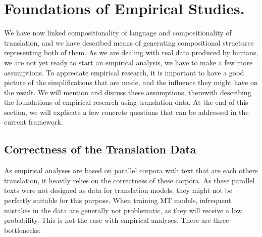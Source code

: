 \documentclass{report}
\theoremstyle{break}
\begin{document}
\section{Foundations of Empirical Studies.}

We have now linked compositionality of language and compositionality of translation, and we have described means of generating compositional structures representing both of them. As we are dealing with real data produced by humans, we are not yet ready to start an empirical analysis, we have to make a few more assumptions. To appreciate empirical research, it is important to have a good picture of the simplifications that are made, and the influence they might have on the result. We will mention and discuss these assumptions, therewith describing the foundations of empirical research using translation data. At the end of this section, we will explicate a few concrete questions that can be addressed in the current framework.
%


\subsection{Correctness of the Translation Data}

As empirical analyses are based on parallel corpora with text that are each others translation, it heavily relies on the correctness of these corpora. As these parallel texts were not designed as data for translation models, they might not be perfectly suitable for this purpose. When training MT models, infrequent mistakes in the data are generally not problematic, as they will receive a low probability. This is not the case with empirical analyses. There are three bottlenecks:
\end{document}
